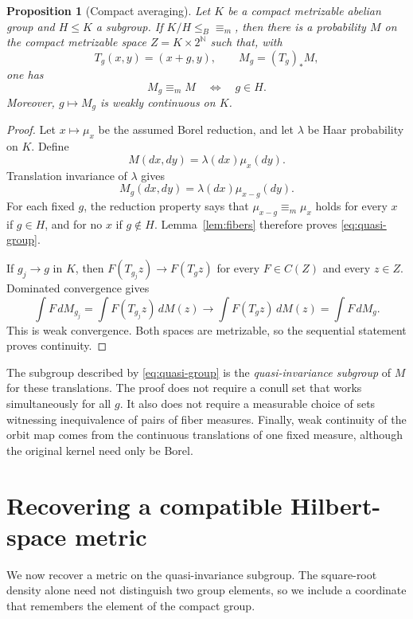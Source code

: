 \documentclass[11pt]{article}
\newtheorem{proposition}[theorem]{Proposition}
\theoremstyle{definition}
\newcommand{\N}{\mathbb N}
\newcommand{\ME}{\mathrel{\equiv_m}}
\newcommand{\leB}{\mathrel{\leq_B}}
\begin{document}
\begin{proposition}[Compact averaging]\label{prop:averaging}
Let $K$ be a compact metrizable abelian group and $H\leq K$ a subgroup.
If $K/H\leB\ME$, then there is a
probability $M$ on the compact metrizable space $Z=K\times2^\N$ such
that, with
\[
 T_g(x,y)=(x+g,y),\qquad M_g=(T_g)_*M,
\]
one has
\begin{equation}\label{eq:quasi-group}
 M_g\ME M\quad\Longleftrightarrow\quad g\in H.
\end{equation}
Moreover, $g\mapsto M_g$ is weakly continuous on $K$.
\end{proposition}
\begin{proof}
Let $x\mapsto\mu_x$ be the assumed Borel reduction, and let $\lambda$
be Haar probability on $K$. Define
\[
 M(dx,dy)=\lambda(dx)\mu_x(dy).
\]
Translation invariance of $\lambda$ gives
\[
 M_g(dx,dy)=\lambda(dx)\mu_{x-g}(dy).
\]
For each fixed $g$, the reduction property says that
$\mu_{x-g}\ME\mu_x$ holds for every $x$ if $g\in H$, and for no $x$
if $g\notin H$. Lemma~\ref{lem:fibers} therefore proves
\eqref{eq:quasi-group}.

If $g_j\to g$ in $K$, then $F(T_{g_j}z)\to F(T_gz)$ for every
$F\in C(Z)$ and every $z\in Z$. Dominated convergence gives
\[
 \int F\,dM_{g_j}=\int F(T_{g_j}z)\,dM(z)
 \longrightarrow\int F(T_gz)\,dM(z)=\int F\,dM_g.
\]
This is weak convergence. Both spaces are metrizable, so the sequential
statement proves continuity.
\end{proof}

The subgroup described by \eqref{eq:quasi-group} is the
\emph{quasi-invariance subgroup} of $M$ for these translations. The
proof does not require a conull set that works simultaneously for all
$g$. It also does not require a measurable choice of sets witnessing
inequivalence of pairs of fiber measures. Finally, weak continuity of
the orbit map comes from the continuous translations of one fixed
measure, although the original kernel need only be Borel.
\section{Recovering a compatible Hilbert-space metric}
We now recover a metric on the quasi-invariance subgroup. The square-root
density alone need not distinguish two group elements, so we include a
coordinate that remembers the element of the compact group.
\end{document}
